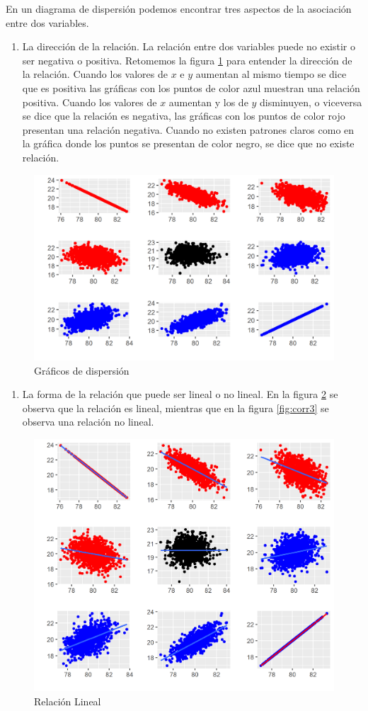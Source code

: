 \documentclass[letterpaper,]{book}
\providecommand{\tightlist}{%
  \setlength{\itemsep}{0pt}\setlength{\parskip}{0pt}}
\begin{document}
En un diagrama de dispersión podemos encontrar tres aspectos de la asociación entre dos variables.

\begin{enumerate}
\def\labelenumi{\arabic{enumi}.}
\tightlist
\item
  La dirección de la relación. La relación entre dos variables puede no existir o ser negativa o positiva. Retomemos la figura \ref{fig:corr} para entender la dirección de la relación. Cuando los valores de \(x\) e \(y\) aumentan al mismo tiempo se dice que es positiva las gráficas con los puntos de color azul muestran una relación positiva. Cuando los valores de \(x\) aumentan y los de \(y\) disminuyen, o viceversa se dice que la relación es negativa, las gráficas con los puntos de color rojo presentan una relación negativa. Cuando no existen patrones claros como en la gráfica donde los puntos se presentan de color negro, se dice que no existe relación.
\end{enumerate}

\begin{figure}[!h]

{\centering \includegraphics[width=0.5\linewidth]{corr} 

}

\caption{Gráficos de dispersión}\label{fig:corr}
\end{figure}

\begin{enumerate}
\def\labelenumi{\arabic{enumi}.}
\setcounter{enumi}{1}
\tightlist
\item
  La forma de la relación que puede ser lineal o no lineal. En la figura \ref{fig:corr2} se observa que la relación es lineal, mientras que en la figura \ref{fig:corr3} se observa una relación no lineal.
\end{enumerate}

\begin{figure}[!h]

{\centering \includegraphics[width=0.5\linewidth]{corr2} 

}

\caption{Relación Lineal}\label{fig:corr2}
\end{figure}
\end{document}

